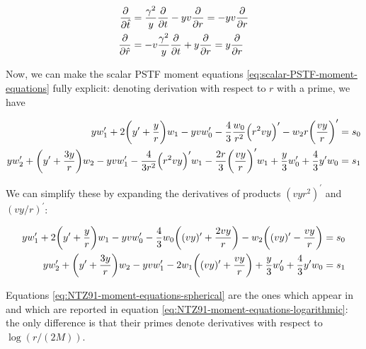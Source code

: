 \documentclass[main.tex]{subfiles}
\begin{document}
\begin{subequations}
\begin{align}
  \pdv{}{\hat{t}} &= \frac{\gamma^2}{y} \pdv{}{t} - yv \pdv{}{r} = - yv \pdv{}{r}  \\
  \pdv{}{\hat{r}} &= -v \frac{\gamma^2}{y} \pdv{}{t} + y \pdv{}{r} = y \pdv{}{r}
\end{align}
\end{subequations}

Now, we can make the scalar PSTF moment equations \eqref{eq:scalar-PSTF-moment-equations} fully explicit: denoting derivation with respect to \(r\) with a prime, we have

\begin{subequations}
\begin{align}
  y w_1^{\prime} + 2 \qty(y^{\prime} + \frac{y}{r}) w_1
  -yv w_0^{\prime}
  - \frac{4}{3} \frac{w_0}{r^2} \qty(r^2 v y)^{\prime}
  - w_2 r \qty(\frac{vy}{r})^{\prime} &= s_0  \\
  y w_2^{\prime} + \qty(y^{\prime} + \frac{3y}{r})w_2
  - yv w_1 ^{\prime} - \frac{4}{3r^2} \qty(r^2 vy)^{\prime} w_1
  - \frac{2r}{3} \qty(\frac{vy}{r})^{\prime} w_1
  + \frac{y}{3} w_0^{\prime} + \frac{4}{3} y^{\prime} w_0
  &= s_1
\end{align}
\end{subequations}

We can simplify these by expanding the derivatives of products \((vyr^2)^{\prime}\) and \((vy/r)^{\prime}\):

\begin{subequations} \label{eq:NTZ91-moment-equations-spherical}
\begin{align}
  y w_1^{\prime} + 2 \qty(y^{\prime} + \frac{y}{r}) w_1
  -yv w_0^{\prime}
  - \frac{4}{3} w_0 \qty((v y)^{\prime} + \frac{2vy}{r})
  - w_2 \qty((vy)^{\prime} - \frac{vy}{r}) &= s_0  \\
  y w_2^{\prime} + \qty(y^{\prime} + \frac{3y}{r})w_2
  - yv w_1 ^{\prime}
  - 2 w_1 \qty((vy)' + \frac{vy}{r})
  + \frac{y}{3} w_0^{\prime} + \frac{4}{3} y^{\prime} w_0
  &= s_1
\end{align}
\end{subequations}

Equations \eqref{eq:NTZ91-moment-equations-spherical} are the ones which appear in  \textcite[eq. 4]{NobiliTurollaZampieri:1991dec} and which are reported in equation \eqref{eq:NTZ91-moment-equations-logarithmic}: the only difference is that their primes denote derivatives with respect to \(\log (r / (2M))\).
\end{document}
